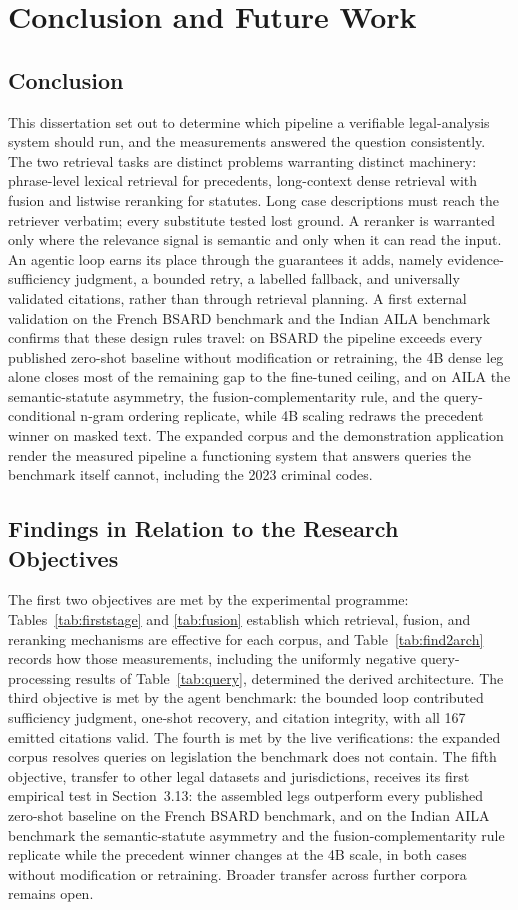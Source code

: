 \documentclass{mnnit}
\begin{document}
\chapter{Conclusion and Future Work}

\section{Conclusion}
This dissertation set out to determine which pipeline a
verifiable legal-analysis system should run, and the measurements
answered the question consistently. The two retrieval tasks are
distinct problems warranting distinct machinery: phrase-level
lexical retrieval for precedents, long-context dense retrieval
with fusion and listwise reranking for statutes. Long case
descriptions must reach the retriever verbatim; every substitute
tested lost ground. A reranker is warranted only where the
relevance signal is semantic and only when it can read the input.
An agentic loop earns its place through the guarantees it adds,
namely evidence-sufficiency judgment, a bounded retry, a labelled
fallback, and universally validated citations, rather than
through retrieval planning. A first external validation on the
French BSARD benchmark and the Indian AILA benchmark confirms
that these design rules travel: on BSARD the pipeline exceeds
every published zero-shot baseline without modification or
retraining, the 4B dense leg alone closes most of the remaining
gap to the fine-tuned ceiling, and on AILA the semantic-statute
asymmetry, the fusion-complementarity rule, and the
query-conditional n-gram ordering replicate, while 4B scaling
redraws the precedent winner on masked text. The
expanded corpus and the demonstration application render the
measured pipeline a functioning system that answers queries the
benchmark itself cannot, including the 2023 criminal codes.

\section{Findings in Relation to the Research Objectives}
The first two objectives are met by the experimental programme:
Tables~\ref{tab:firststage} and \ref{tab:fusion} establish which
retrieval, fusion, and reranking mechanisms are effective for
each corpus, and Table~\ref{tab:find2arch} records how those
measurements, including the uniformly negative query-processing
results of Table~\ref{tab:query}, determined the derived
architecture. The third objective is met by the agent benchmark:
the bounded loop contributed sufficiency judgment, one-shot
recovery, and citation integrity, with all 167 emitted citations
valid. The fourth is met by the live verifications: the expanded
corpus resolves queries on legislation the benchmark does not
contain. The fifth objective, transfer to other legal datasets
and jurisdictions, receives its first empirical test in
Section~3.13: the assembled legs outperform every published
zero-shot baseline on the French BSARD benchmark, and on the
Indian AILA benchmark the semantic-statute asymmetry and the
fusion-complementarity rule replicate while the precedent
winner changes at the 4B scale, in both cases without
modification or retraining.
Broader transfer across further corpora remains open.
\end{document}
